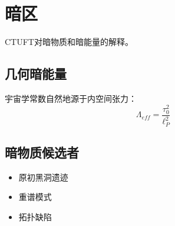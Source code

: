 \section{暗区}
\label{sec:dark_sector}

CTUFT对暗物质和暗能量的解释。

\subsection{几何暗能量}

宇宙学常数自然地源于内空间张力：
\begin{equation}
\Lambda_{eff} = \frac{\tau_0^2}{\ell_P^2}
\end{equation}

\subsection{暗物质候选者}

\begin{itemize}
    \item 原初黑洞遗迹
    \item 重谱模式
    \item 拓扑缺陷
\end{itemize}
